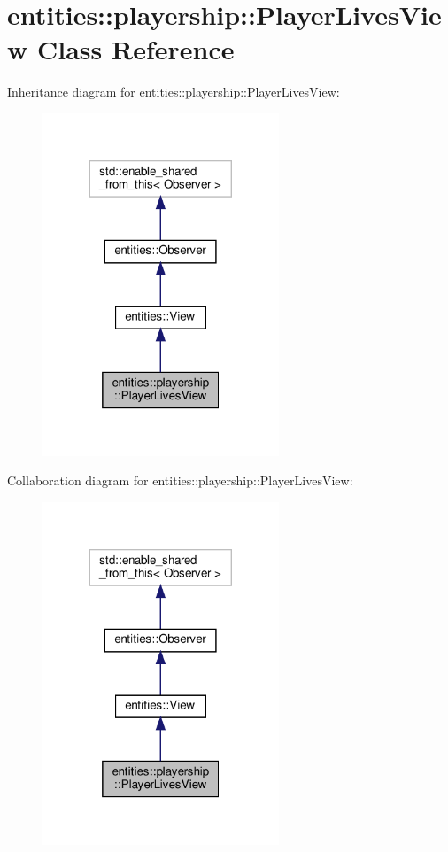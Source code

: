 \hypertarget{classentities_1_1playership_1_1PlayerLivesView}{}\section{entities\+:\+:playership\+:\+:Player\+Lives\+View Class Reference}
\label{classentities_1_1playership_1_1PlayerLivesView}


Inheritance diagram for entities\+:\+:playership\+:\+:Player\+Lives\+View\+:\nopagebreak
\begin{figure}[H]
\begin{center}
\leavevmode
\includegraphics[width=200pt]{classentities_1_1playership_1_1PlayerLivesView__inherit__graph}
\end{center}
\end{figure}


Collaboration diagram for entities\+:\+:playership\+:\+:Player\+Lives\+View\+:\nopagebreak
\begin{figure}[H]
\begin{center}
\leavevmode
\includegraphics[width=200pt]{classentities_1_1playership_1_1PlayerLivesView__coll__graph}
\end{center}
\end{figure}
